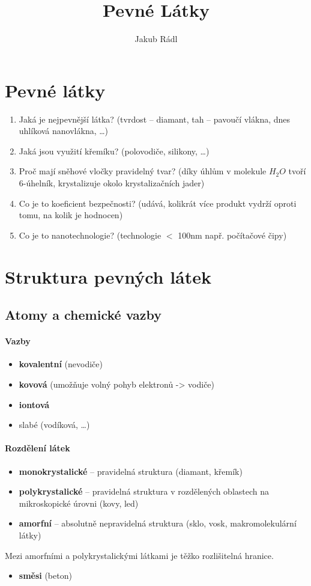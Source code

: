 \documentclass[10pt,a4paper]{article}
\title{Pevné Látky}
\author{Jakub Rádl}
\begin{document}
\maketitle
\tableofcontents
\newpage
\section{Pevné látky}
\begin{enumerate}
\item Jaká je nejpevnější látka? (tvrdost -- diamant, tah -- pavoučí vlákna, dnes uhlíková nanovlákna, \ldots)
\item Jaká jsou využití křemíku? (polovodiče, silikony, \ldots)
\item Proč mají sněhové vločky pravidelný tvar? (díky úhlům v molekule $H_2O$ tvoří 6-úhelník, krystalizuje okolo krystalizačních jader)
\item Co je to koeficient bezpečnosti? (udává, kolikrát více produkt vydrží oproti tomu, na kolik je hodnocen)
\item Co je to nanotechnologie? (technologie $<$ 100nm např. počítačové čipy)
\end{enumerate}

\section{Struktura pevných látek}
\subsection{Atomy a chemické vazby}
\paragraph{Vazby}
\begin{itemize}
\item \textbf{kovalentní} (nevodiče)
\item \textbf{kovová} (umožňuje volný pohyb elektronů -> vodiče)
\item \textbf{iontová} 
\item slabé (vodíková, \ldots)
\end{itemize}

\paragraph{Rozdělení látek}
\begin{itemize}
\item \textbf{monokrystalické} -- pravidelná struktura (diamant, křemík)
\item \textbf{polykrystalické} -- pravidelná struktura v rozdělených oblastech na mikroskopické úrovni (kovy, led)
\item \textbf{amorfní} -- absolutně nepravidelná struktura (sklo, vosk, makromolekulární látky)
\end{itemize}
Mezi amorfními a polykrystalickými látkami je těžko rozlišitelná hranice.
\begin{itemize}
\item \textbf{směsi} (beton)
\end{itemize}
\end{document}
